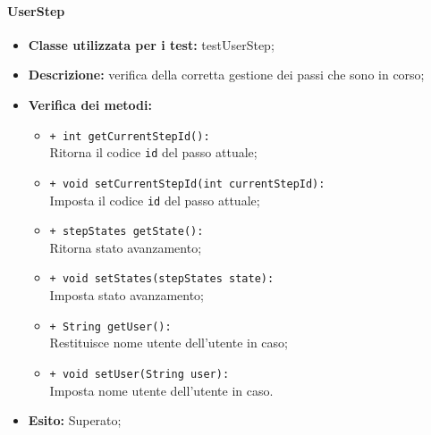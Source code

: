 \paragraph{UserStep}
\begin{flushleft}
\begin{itemize}
\item \textbf{Classe utilizzata per i test:} testUserStep;
\item \textbf{Descrizione:} verifica della corretta gestione dei passi che sono in corso;
\item \textbf{Verifica dei metodi:}
\begin{sloppypar}
\begin{itemize}
\item \texttt{+ int getCurrentStepId():}\\ Ritorna il codice \texttt{id} del passo attuale;
\item \texttt{+ void setCurrentStepId(int currentStepId):}\\ Imposta il codice \texttt{id} del passo attuale;
\item \texttt{+ stepStates getState():}\\ Ritorna stato avanzamento;
\item \texttt{+ void setStates(stepStates state):}\\ Imposta stato avanzamento;
\item \texttt{+ String getUser():}\\ Restituisce nome utente dell'utente in caso;
\item \texttt{+ void setUser(String user):}\\ Imposta nome utente dell'utente in caso.
\end{itemize}
\end{sloppypar}
\item \textbf{Esito:} Superato;
\end{itemize}
\end{flushleft}

